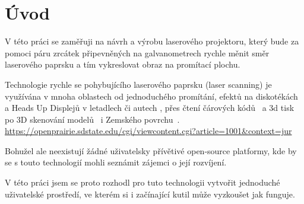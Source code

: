 \chapter*{Úvod}
V této práci se zaměřuji na návrh a výrobu laserového projektoru, který bude za pomoci páru zrcátek připevněných na galvanometrech rychle měnit směr laserového paprsku a tím vykreslovat obraz na promítací plochu.

Technologie rychle se pohybujícího laserového paprsku (laser scanning) je využívána v mnoha oblastech od jednoduchého promítání, efektů na diskotékách a Heads Up Displejů v letadlech či autech \cite{huds-in-driving}, přes čtení čárových kódů~\cite{history-of-barcode-scanning} a 3d tisk~\cite{laser-sintering} po 3D skenování modelů~\cite{3d-model-scan} i Zemského povrchu~\cite{heightmaps}. \url{https://openprairie.sdstate.edu/cgi/viewcontent.cgi?article=1001&context=jur}

Bohužel ale neexistují žádné uživatelsky přívětivé open-source platformy, kde by se s touto technologií mohli seznámit zájemci o její rozvíjení.

V této práci jsem se proto rozhodl pro tuto technologii vytvořit jednoduché uživatelské prostředí, ve kterém si i začínající kutil může vyzkoušet jak funguje.